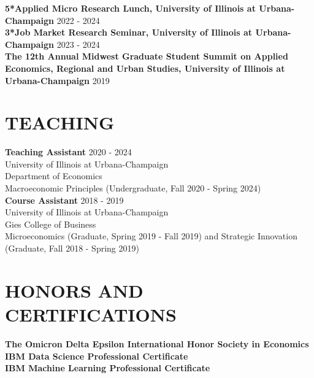 \documentclass[a4paper,9pt]{extarticle}
\begin{document}
\noindent
\newline
\textbf{5*Applied Micro Research Lunch, University of Illinois at Urbana-Champaign} \hfill  2022 - 2024 \\
\textbf{3*Job Market Research Seminar, University of Illinois at Urbana-Champaign} \hfill  2023 - 2024 \\
\textbf{The 12th Annual Midwest Graduate Student Summit on Applied Economics, Regional and Urban Studies, University of Illinois at Urbana-Champaign} \hfill 2019 \\


\section*{TEACHING}

\noindent
\textbf{Teaching Assistant} \hfill 2020 - 2024 \\
University of Illinois at Urbana-Champaign \\ 
Department of Economics \\
Macroeconomic Principles (Undergraduate, Fall 2020 - Spring 2024) \\

\noindent
\textbf{Course Assistant} \hfill 2018 - 2019 \\
University of Illinois at Urbana-Champaign \\ 
Gies College of Business \\
Microeconomics (Graduate, Spring 2019 - Fall 2019) and Strategic Innovation (Graduate, Fall 2018 - Spring 2019)


\section*{HONORS AND CERTIFICATIONS}

\noindent
\newline
\textbf{The Omicron Delta Epsilon International Honor Society in Economics} \\

\noindent
\textbf{IBM Data Science Professional Certificate} \\

\noindent
\textbf{IBM Machine Learning Professional Certificate} \\

\end{document}
